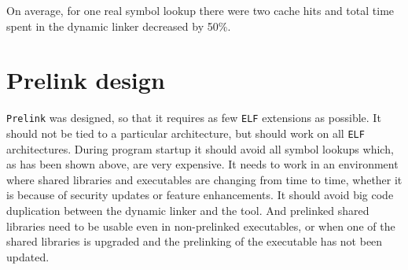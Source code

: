 \documentclass[twoside]{article}
\def\tts#1{\texttt{\small #1}}
\begin{document}

On average, for one real symbol lookup there were two cache hits and total
time spent in the dynamic linker decreased by 50\%.

\section{Prelink design}

\tts{Prelink} was designed, so that it requires as few \tts{ELF} extensions
as possible.  It should not be tied to a particular architecture, but
should work on all \tts{ELF} architectures.  During program startup it
should avoid all symbol lookups which, as has been shown above, are
very expensive.  It needs to work in an environment where shared
libraries and executables are changing from time to time, whether it is
because of security updates or feature enhancements.  It should avoid big code
duplication between the dynamic linker and the tool.  And prelinked
shared libraries need to be usable even in non-prelinked executables,
or when one of the shared libraries is upgraded and the prelinking of the
executable has not been updated.
\end{document}
